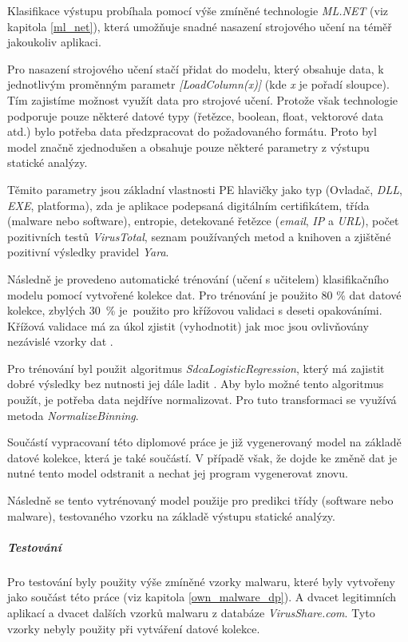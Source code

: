 Klasifikace výstupu probíhala pomocí výše zmíněné technologie \emph{ML.NET} (viz kapitola \ref{ml_net}), která umožňuje snadné nasazení strojového učení na téměř jakoukoliv aplikaci.

Pro nasazení strojového učení stačí přidat do modelu, který obsahuje data, k jednotlivým proměnným parametr \emph{[LoadColumn(x)]} (kde \emph{x} je pořadí sloupce). Tím zajistíme možnost využít data pro strojové učení. Protože však technologie podporuje pouze některé datové typy (řetězce, boolean, float, vektorové data atd.) bylo potřeba data předzpracovat do požadovaného formátu. Proto byl model značně zjednodušen a obsahuje pouze některé parametry z výstupu statické analýzy.

Těmito parametry jsou základní vlastnosti PE hlavičky jako typ (Ovladač, \emph{DLL}, \emph{EXE}, platforma), zda je aplikace podepsaná digitálním certifikátem, třída (malware nebo software), entropie, detekované řetězce (\emph{email}, \emph{IP} a \emph{URL}), počet pozitivních testů \emph{VirusTotal}, seznam používaných metod a knihoven a zjištěné pozitivní výsledky pravidel \emph{Yara}.

Následně je provedeno automatické trénování (učení s učitelem) klasifikačního modelu pomocí vytvořené kolekce dat. Pro trénování je použito 80 \% dat datové kolekce, zbylých 30~\% je~použito pro křížovou validaci s deseti opakováními. Křížová validace má za úkol zjistit (vyhodnotit) jak moc jsou ovlivňovány nezávislé vzorky dat \cite{crossvalidation}.

Pro trénování byl použit algoritmus \emph{SdcaLogisticRegression}, který má zajistit dobré výsledky bez nutnosti jej dále ladit \cite{ms_mlnettraining}. Aby bylo možné tento algoritmus použít, je potřeba data nejdříve normalizovat. Pro tuto transformaci se využívá metoda \emph{NormalizeBinning}.

Součástí vypracovaní této diplomové práce je již vygenerovaný model na základě datové kolekce, která je také součástí. V případě však, že dojde ke změně dat je nutné tento model odstranit a nechat jej program vygenerovat znovu.

Následně se tento vytrénovaný model použije pro predikci třídy (software nebo malware), testovaného vzorku na základě výstupu statické analýzy.

\subparagraph*{Testování}
\label{my_malware_tests}

Pro testování byly použity výše zmíněné vzorky malwaru, které byly vytvořeny jako součást této práce (viz kapitola \ref{own_malware_dp}). A dvacet legitimních aplikací a dvacet dalších vzorků malwaru z databáze \emph{VirusShare.com}. Tyto vzorky nebyly použity při vytváření datové kolekce.

